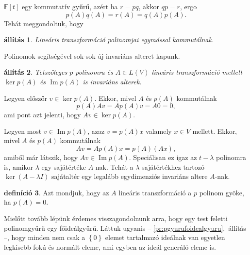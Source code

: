 \documentclass[a4paper, showtrims]{memoir}
\makeatletter
\renewenvironment{proof}[1][\proofname]
    {\par\pushQED{\qed}%
    \normalfont \topsep6\p@\@plus6\p@\relax
    \trivlist
    \item[\hskip\labelsep
        \itshape
    #1\@addpunct{:}]\ignorespaces}
    {\popQED\endtrivlist\@endpefalse}
\theoremstyle{plain}
\newtheorem{proposition}{állítás}[chapter]
\theoremstyle{remark}
\theoremstyle{definition}
\newtheorem{definition}[proposition]{definíció}
\DeclareMathOperator{\im}{Im}
\makeatother
\begin{document}
$\mathbb{F}\left[ t \right]$ egy kommutatív gyűrű,
azért ha $r=pq$, akkor $qp=r$,
ergo
\[
	p\left( A \right)q\left( A \right)=r\left( A \right)=q\left( A \right)p\left( A \right).
\]
Tehát meggondoltuk, hogy
\begin{proposition}
	Lineáris transzformáció polinomjai egymással kommutálnak.
\end{proposition}
Polinomok segítségével sok-sok új invariáns alteret kapunk.
\begin{proposition}
	Tetszőleges $p$ polinomra és $A\in L\left( V \right)$
	lineáris transzformáció mellett
	$\ker p\left( A \right)$ és $\im p\left( A \right)$ is invariáns alterek.
\end{proposition}
\begin{proof}
	Legyen előszőr $v\in\ker p\left( A \right)$.
	Ekkor, mivel $A$ és $p\left( A \right)$ kommutálnak
	\[
		p\left( A \right)Av=Ap\left( A \right)v=A0=0,
	\]
	ami pont azt jelenti, hogy $Av\in\ker p\left( A \right)$.

	Legyen most $v\in\im p\left( A \right)$,
	azaz
	$v=p\left( A \right)x$ valamely $x\in V$ mellett.
	Ekkor, mivel $A$ és $p\left( A \right)$ kommutálnak
	\[
		Av=Ap\left( A \right)x=p\left( A \right)\left( Ax \right),
	\]
	amiből már látszik, hogy $Av\in\im p\left( A \right)$.
\end{proof}
Speciálisan ez igaz az $t-\lambda$ polinomra is,
amikor $\lambda$
egy sajátértéke $A$-nak. Tehát a $\lambda$ sajátértékhez tartozó
$\ker \left( A-\lambda I \right)$ sajátaltér egy legalább egydimenziós invariáns altere
$A$-nak.
\begin{definition}
	Azt mondjuk, hogy az $A$ lineáris transzformáció a $p$ polinom gyöke,
	ha $p\left( A \right)=0$.
\end{definition}
Mielőtt tovább lépünk érdemes visszagondolnunk arra,
hogy egy test feletti polinomgyűrű egy főideálgyűrű.
Láttuk ugyanis
-- \ref{pr:pgyurufoidealgyuru}.~állítás --,
hogy minden nem csak a $\left\{ 0 \right\}$ elemet tartalmazó ideálnak
van egyetlen legkisebb fokú és normált eleme,
ami egyben az ideál generáló eleme is.
\end{document}
